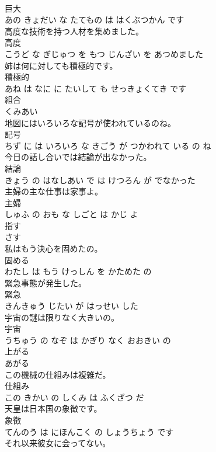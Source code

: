 \documentclass[8pt]{extreport}
\begin{document}
\begin{CJK}{UTF8}{min}
\\	巨大 
\\	あの きょだい な たてもの は はくぶつかん です		
\\	高度な技術を持つ人材を集めました。	
\\	高度 
\\	こうど な ぎじゅつ を もつ じんざい を あつめました		
\\	姉は何に対しても積極的です。	
\\	積極的 
\\	あね は なに に たいして も せっきょくてき です		
\\	組合	
\\	くみあい		
\\	地図にはいろいろな記号が使われているのね。	
\\	記号 
\\	ちず に は いろいろ な きごう が つかわれて いる の ね		
\\	今日の話し合いでは結論が出なかった。	
\\	結論 
\\	きょう の はなしあい で は けつろん が でなかった		
\\	主婦の主な仕事は家事よ。	
\\	主婦 
\\	しゅふ の おも な しごと は かじ よ		
\\	指す	
\\	さす		
\\	私はもう決心を固めたの。	
\\	固める 
\\	わたし は もう けっしん を かためた の		
\\	緊急事態が発生した。	
\\	緊急 
\\	きんきゅう じたい が はっせい した		
\\	宇宙の謎は限りなく大きいの。	
\\	宇宙 
\\	うちゅう の なぞ は かぎり なく おおきい の		
\\	上がる	
\\	あがる		
\\	この機械の仕組みは複雑だ。	
\\	仕組み 
\\	この きかい の しくみ は ふくざつ だ		
\\	天皇は日本国の象徴です。	
\\	象徴 
\\	てんのう は にほんこく の しょうちょう です		
\\	それ以来彼女に会ってない。	

\end{CJK}
\end{document}
